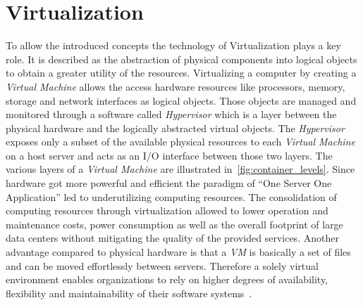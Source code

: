 \section{Virtualization}
To allow the introduced concepts the technology of Virtualization plays a key role.
It is described as the abstraction of physical components into logical objects to obtain a greater utility of the resources.
Virtualizing a computer by creating a \textit{Virtual Machine} allows the access hardware resources like processors, memory, storage and network interfaces as logical objects.
Those objects are managed and monitored through a software called \textit{Hypervisor} which is a layer between the physical hardware and the logically abstracted virtual objects. The \textit{Hypervisor} exposes only a subset of the available physical resources to each \textit{Virtual Machine} on a host server and acts as an I/O interface between those two layers.
The various layers of a \textit{Virtual Machine} are illustrated in~\cref{fig:container_levels}.
Since hardware got more powerful and efficient the paradigm of \enquote{One Server One Application} led to underutilizing computing resources.
The consolidation of computing resources through virtualization allowed to lower operation and maintenance costs, power consumption as well as the overall footprint of large data centers without mitigating the quality of the provided services.
Another advantage compared to physical hardware is that a \textit{VM} is basically a set of files and can be moved effortlessly between servers.
Therefore a solely virtual environment enables organizations to rely on higher degrees of availability, flexibility and maintainability of their software systems~\cite{virt1}.

